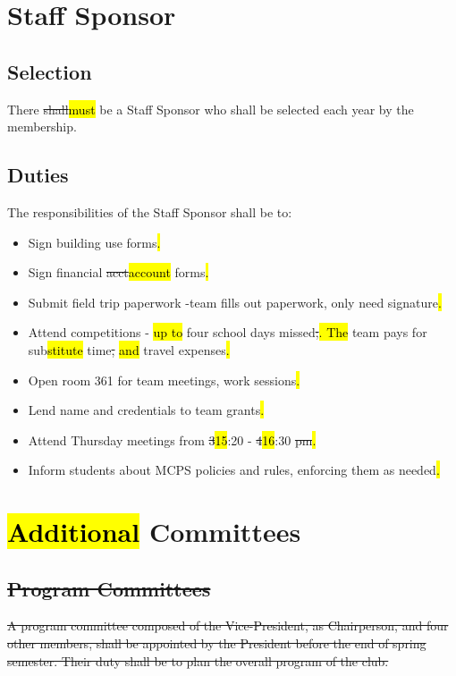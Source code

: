 \documentclass[12pt, a4paper]{article}
\begin{document}
\section{Staff Sponsor}
\subsection{Selection}
There \st{shall}\hl{must} be a Staff Sponsor who shall be selected each year by the membership.
\subsection{Duties}
The responsibilities of the Staff Sponsor shall be to:
\begin{itemize}
\item Sign building use forms\hl{.}
\item Sign financial \st{acct}\hl{account} forms\hl{.}
\item Submit field trip paperwork -team fills out paperwork, only need signature\hl{.}
\item Attend competitions - \hl{up to }four school days missed\st{;}\hl{. The} team pays for sub\hl{stitute} time\st{,} \hl{and} travel expenses\hl{.}
\item Open room 361 for team meetings, work sessions\hl{.}
\item Lend name and credentials to team grants\hl{.}
\item Attend Thursday meetings from \st{3}\hl{15}:20 - \st{4}\hl{16}:30 \st{pm}\hl{.}
\item Inform students about MCPS policies and rules, enforcing them as needed\hl{.}
\end{itemize}
\section{\hl{Additional} Committees}
\subsection{\st{Program Committees}}
\st{A program committee composed of the Vice-President, as Chairperson, and four other members, shall be appointed by the President before the end of spring semester. Their duty shall be to plan the overall program of the club.}
\end{document}
